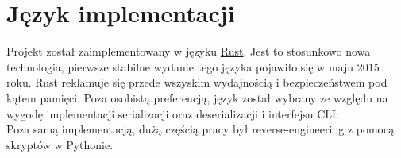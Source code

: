 \section{Język implementacji}
Projekt został zaimplementowany w języku \href{https://www.rust-lang.org/}{Rust}.
Jest to stosunkowo nowa technologia, pierwsze stabilne wydanie tego języka pojawiło się w maju 2015 roku.
Rust reklamuje się przede wszyskim wydajnością i bezpieczeństwem pod kątem pamięci.
Poza osobistą preferencją, język został wybrany ze względu na wygodę implementacji serializacji oraz deserializacji i interfejsu CLI. \\
Poza samą implementacją, dużą częścią pracy był reverse-engineering z pomocą skryptów w Pythonie.